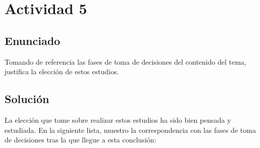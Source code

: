\section{Actividad 5}

\subsection{Enunciado}
Tomando de referencia las fases de toma de decisiones del contenido del tema, justifica la elección de estos estudios.

\subsection{Solución}
La elección que tome sobre realizar estos estudios ha sido bien pensada y estudiada. En la siguiente lista, muestro la correspondencia con las fases de toma de decisiones tras la que llegue a esta conclusión:

